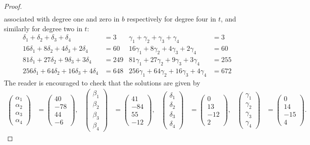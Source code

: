 \documentclass[a4paper,11pt]{amsart}
\begin{document}
\begin{proof}
\begin{align*}
\end{align*}
associated with degree one and zero in $b$ respectively for degree four in $t$, and similarly for degree two in $t$:
\begin{align*}
 \delta_1 + \delta_2 + \delta_3 + \delta_4 &=3  & \gamma_1 + \gamma_2 + \gamma_3 + \gamma_4 &=3\\
 16 \delta_1 + 8 \delta_2 + 4\delta_3 + 2\delta_4 &= 60 & 
16 \gamma_1 + 8 \gamma_2 + 4\gamma_3 + 2\gamma_4 &= 60  \\
81 \delta_1 + 27 \delta_2 + 9\delta_3 + 3\delta_4 &= 249 & 
81 \gamma_1 + 27 \gamma_2 + 9\gamma_3 + 3\gamma_4 &= 255 \\
256 \delta_1 + 64 \delta_2 + 16\delta_3 + 4\delta_4 &= 648 & 
256 \gamma_1 + 64 \gamma_2 + 16\gamma_3 + 4\gamma_4 &= 672 
\end{align*}
The reader is encouraged to check that the solutions are given by 
\begin{align}\label{solutions}
\begin{pmatrix}
\alpha_1 \\
\alpha_2 \\ 
\alpha_3 \\
\alpha_4
\end{pmatrix} &= \begin{pmatrix}
40 \\
-78 \\ 
44 \\
-6
\end{pmatrix}, & \begin{pmatrix}
\beta_1 \\
\beta_2 \\ 
\beta_3 \\
\beta_4
\end{pmatrix} &= \begin{pmatrix}
41 \\
-84 \\ 
55 \\
-12
\end{pmatrix}, & \begin{pmatrix}
\delta_1 \\
\delta_2 \\ 
\delta_3 \\
\delta_4
\end{pmatrix} &= \begin{pmatrix}
0 \\
13 \\ 
-12 \\
2
\end{pmatrix}, & \begin{pmatrix}
\gamma_1 \\
\gamma_2 \\ 
\gamma_3 \\
\gamma_4
\end{pmatrix} &= \begin{pmatrix}
0 \\
14 \\ 
-15 \\
4
\end{pmatrix}.
\end{align}


\end{proof}
\end{document}

